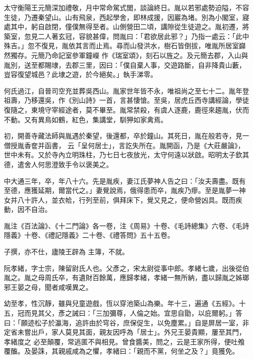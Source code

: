 \begin{pinyinscope}
 太守衡陽王元簡深加禮敬，月中常命駕式閭，談論終日。胤以若邪處勢迫隘，不容生徒，乃遷秦望山。山有飛泉，西起學舍，即林成援，因巖為堵。別為小閣室，寢處其中，躬自啟閉，僮僕無得至者。山側營田二頃，講隙從生徒遊之。胤初遷，將築室，忽見二人著玄冠，容貌甚偉，問胤曰：「君欲居此邪？」乃指一處云：「此中殊吉。」忽不復見，胤依其言而止焉。尋而山發洪水，樹石皆倒拔，唯胤所居室巋然獨存。元簡乃命記室參軍鐘嶸
 作《瑞室頌》，刻石以旌之。及元簡去郡，入山與胤別，送至都賜埭，去郡三里，因曰：「僕自棄人事，交遊路斷，自非降貴山藪，豈容復望城邑？此埭之遊，於今絕矣。」執手涕零。



 何氏過江，自晉司空充並葬吳西山。胤家世年皆不永，唯祖尚之至七十二。胤年登祖壽，乃移還吳，作《別山詩》一首，言甚悽愴。至吳，居虎丘西寺講經論，學徒復隨之，東境守宰經途者，莫不畢至。胤常禁殺，有虞人逐鹿，鹿徑來趨胤，伏而不動。又有異鳥如鶴，紅色，集講堂，馴狎如家禽焉。



 初，開善寺藏法師與胤遇於秦望，後還都，卒於鐘山。其死日，胤在般若寺，見一僧授胤香奩并函書，
 云「呈何居士」，言訖失所在。胤開函，乃是《大莊嚴論》，世中未有。又於寺內立明珠柱，乃七日七夜放光，太守何遠以狀啟。昭明太子欽其德，遣舍人何思澄致手令以褒美之。



 中大通三年，卒，年八十六。先是胤疾，妻江氏夢神人告之曰：「汝夫壽盡。既有至德，應獲延期，爾當代之。」妻覺說焉，俄得患而卒，胤疾乃瘳。至是胤夢一神女并八十許人，並衣帢，行列至前，俱拜床下，覺又見之，便命營凶具。既而疾動，因不自治。



 胤注《百法論》、《十二門論》各一卷，注《周易》十卷、《毛詩總集》六卷、《毛詩隱義》十卷、《禮記隱義》二十卷、《禮答問》五十五卷。



 子撰，亦不仕，廬陵王辟為
 主簿，不就。



 阮孝緒，字士宗，陳留尉氏人也。父彥之，宋太尉從事中郎。孝緒七歲，出後從伯胤之。胤之母周氏卒，有遺財百餘萬，應歸孝緒，孝緒一無所納，盡以歸胤之姊瑯邪王晏之母，聞者咸嘆異之。



 幼至孝，性沉靜，雖與兒童遊戲，恆以穿池築山為樂。年十三，遍通《五經》。十五，冠而見其父，彥之誡曰：「三加彌尊，人倫之始。宜思自勖，以庇爾躬。」答曰：「願迹松子於瀛海，追許由於穹谷，庶保促生，以免塵累。」自是屏居一室，非定省未嘗出戶，家人莫見其面，親友因呼為「居士」。外兄王晏貴顯，屢至其門，孝緒度之
 必至顛覆，常逃匿不與相見。曾食醬美，問之，云是王家所得，便吐飧覆醢。及晏誅，其親戚咸為之懼，孝緒曰：「親而不黨，何坐之及？」竟獲免。




\end{pinyinscope}
